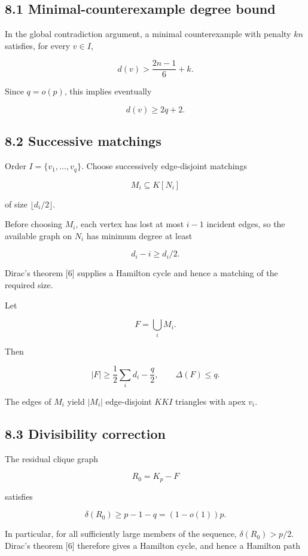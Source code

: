 \documentclass[english,11pt,a4paper]{article}
\begin{document}
\subsection{8.1 Minimal-counterexample degree
bound}\label{minimal-counterexample-degree-bound}

In the global contradiction argument, a minimal counterexample with
penalty \(kn\) satisfies, for every \(v\in I\),

\[
d(v)>
\frac{2n-1}{6}+k.
\tag{8.1}
\]

Since \(q=o(p)\), this implies eventually

\[
d(v)\ge2q+2.
\tag{8.2}
\]

\subsection{8.2 Successive matchings}\label{successive-matchings}

Order \(I=\{v_1,\ldots,v_q\}\). Choose successively edge-disjoint
matchings

\[
M_i\subseteq K[N_i]
\]

of size \(\lfloor d_i/2\rfloor\).

Before choosing \(M_i\), each vertex has lost at most \(i-1\) incident
edges, so the available graph on \(N_i\) has minimum degree at least

\[
d_i-i\ge d_i/2.
\]

Dirac's theorem {[}6{]} supplies a Hamilton cycle and hence a matching
of the required size.

Let

\[
F=\bigcup_iM_i.
\]

Then

\[
|F|
\ge
\frac12\sum_i d_i-\frac q2,
\qquad
\Delta(F)\le q.
\tag{8.3}
\]

The edges of \(M_i\) yield \(|M_i|\) edge-disjoint \(KKI\) triangles
with apex \(v_i\).

\subsection{8.3 Divisibility correction}\label{divisibility-correction}

The residual clique graph

\[
R_0=K_p-F
\]

satisfies

\[
\delta(R_0)
\ge
p-1-q
=(1-o(1))p.
\tag{8.4}
\]

In particular, for all sufficiently large members of the sequence,
\(\delta(R_0)>p/2\). Dirac's theorem {[}6{]} therefore gives a Hamilton
cycle, and hence a Hamilton path
\end{document}
